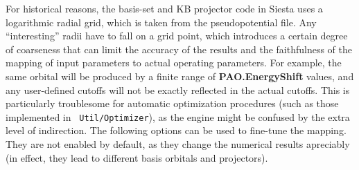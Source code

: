 \documentclass[11pt]{article}
\begin{document}
For historical reasons, the basis-set and KB projector code in {\sc
  Siesta} uses a logarithmic radial grid, which is taken from the
pseudopotential file. Any ``interesting'' radii have to fall on a grid
point, which introduces a certain degree of coarseness that can limit
the accuracy of the results and the faithfulness of the mapping of
input parameters to actual operating parameters. For example, the same
orbital will be produced by a finite range of {\bf PAO.EnergyShift}
values, and any user-defined cutoffs will not be exactly reflected in
the actual cutoffs. This is particularly troublesome for automatic
optimization procedures (such as those implemented in {\tt
  Util/Optimizer}), as the engine might be confused by the extra level
of indirection. The following options can be used to fine-tune the mapping.
They are not enabled by default, as they change the numerical results
apreciably (in effect, they lead to different basis orbitals and
projectors). 
\end{document}
